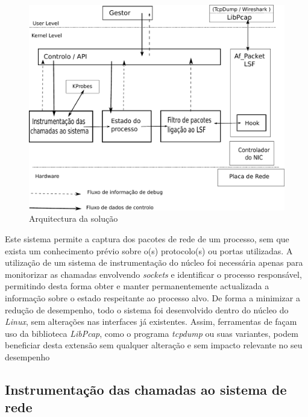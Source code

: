 \documentclass[a4paper]{llncs}
\begin{document}
\begin{figure}[htbp]
\begin{center}
\includegraphics[scale=0.50]{interface.pdf} 
\caption{Arquitectura da solução}
\label{arquitectura}
\end{center}
\end{figure}


Este sistema permite a captura dos pacotes de rede de um processo, sem que exista um conhecimento prévio sobre o(s) protocolo(s) ou portas utilizadas.
 A utilização de um sistema de instrumentação do núcleo foi necessária apenas para monitorizar as chamadas envolvendo \emph{sockets} e identificar o processo responsável, permitindo desta forma obter e manter permanentemente actualizada a informação sobre o estado respeitante ao processo alvo.
 De forma a minimizar a redução de desempenho, todo o sistema foi desenvolvido dentro do núcleo do \textit{Linux}, sem alterações nas interfaces já existentes.
 Assim, ferramentas de façam uso da biblioteca \textit{LibPcap}, como o programa \textit{tcpdump} ou suas variantes, podem beneficiar desta extensão sem qualquer alteração e sem impacto relevante no seu desempenho



\subsection*{Instrumentação das chamadas ao sistema de rede}
\label{sub:mon_syscalls}
\end{document}
